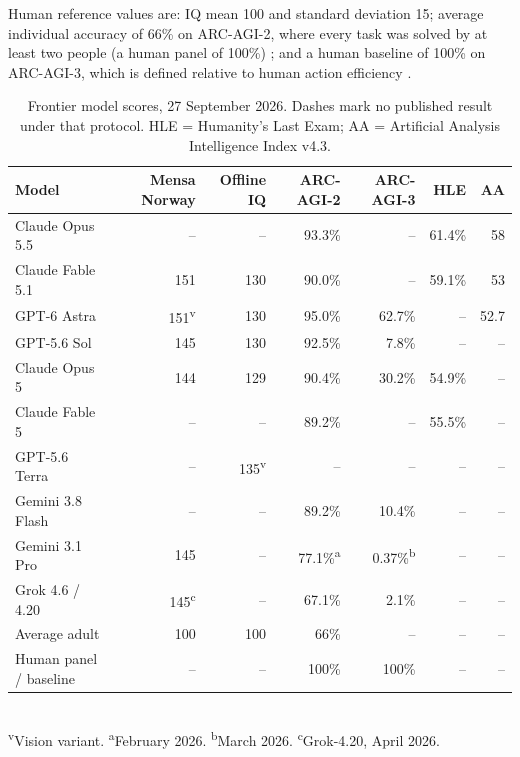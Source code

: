 \documentclass[11pt]{article}
\begin{document}
Human reference values are: IQ mean 100 and standard deviation 15; average individual accuracy of 66\% on ARC-AGI-2, where every task was solved by at least two people (a human panel of 100\%) \citep{arcagi2}; and a human baseline of 100\% on ARC-AGI-3, which is defined relative to human action efficiency \citep{arcagi3}.

\begin{table}[htbp]
\centering\small
\caption{Frontier model scores, 27 September 2026. Dashes mark no published result under that protocol. HLE = Humanity's Last Exam; AA = Artificial Analysis Intelligence Index v4.3.}
\label{tab:board}
\begin{tabular}{@{}lrrrrrr@{}}
\toprule
Model & Mensa Norway & Offline IQ & ARC-AGI-2 & ARC-AGI-3 & HLE & AA \\
\midrule
Claude Opus 5.5 & -- & -- & 93.3\% & -- & 61.4\% & 58 \\
Claude Fable 5.1 & 151 & 130 & 90.0\% & -- & 59.1\% & 53 \\
GPT-6 Astra & 151\textsuperscript{v} & 130 & 95.0\% & 62.7\% & -- & 52.7 \\
GPT-5.6 Sol & 145 & 130 & 92.5\% & 7.8\% & -- & -- \\
Claude Opus 5 & 144 & 129 & 90.4\% & 30.2\% & 54.9\% & -- \\
Claude Fable 5 & -- & -- & 89.2\% & -- & 55.5\% & -- \\
GPT-5.6 Terra & -- & 135\textsuperscript{v} & -- & -- & -- & -- \\
Gemini 3.8 Flash & -- & -- & 89.2\% & 10.4\% & -- & -- \\
Gemini 3.1 Pro & 145 & -- & 77.1\%\textsuperscript{a} & 0.37\%\textsuperscript{b} & -- & -- \\
Grok 4.6 / 4.20 & 145\textsuperscript{c} & -- & 67.1\% & 2.1\% & -- & -- \\
\midrule
Average adult & 100 & 100 & 66\% & -- & -- & -- \\
Human panel / baseline & -- & -- & 100\% & 100\% & -- & -- \\
\bottomrule
\end{tabular}\\[3pt]
\footnotesize \textsuperscript{v}Vision variant. \textsuperscript{a}February 2026. \textsuperscript{b}March 2026. \textsuperscript{c}Grok-4.20, April 2026.
\end{table}
\end{document}
